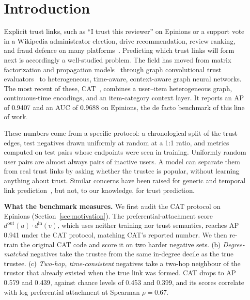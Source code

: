 \documentclass[conference]{IEEEtran}
\begin{document}
\section{Introduction}

Explicit trust links, such as ``I trust this reviewer'' on Epinions or a support vote in a Wikipedia administrator election, drive recommendation, review ranking, and fraud defence on many platforms~\cite{tang2015trust,guha2004propagation}. Predicting which trust links will form next is accordingly a well-studied problem. The field has moved from matrix factorization and propagation models~\cite{yao2013matri,liu2019neuralwalk} through graph convolutional trust evaluators~\cite{lin2020guardian,wang2024trustguard,huo2023trustgnn,jiang2023gatrust} to heterogeneous, time-aware, context-aware graph neural networks. The most recent of these, CAT~\cite{wang2025cat}, combines a user--item heterogeneous graph, continuous-time encodings, and an item-category context layer. It reports an AP of 0.9407 and an AUC of 0.9688 on Epinions, the de facto benchmark of this line of work.

These numbers come from a specific protocol: a chronological split of the trust edges, test negatives drawn uniformly at random at a 1:1 ratio, and metrics computed on test pairs whose endpoints were seen in training. Uniformly random user pairs are almost always pairs of inactive users. A model can separate them from real trust links by asking whether the trustee is popular, without learning anything about trust. Similar concerns have been raised for generic and temporal link prediction~\cite{li2023evaluating,poursafaei2022towards,huang2023tgb}, but not, to our knowledge, for trust prediction.

\textbf{What the benchmark measures.} We first audit the CAT protocol on Epinions (Section~\ref{sec:motivation}). The preferential-attachment score $d^{\text{out}}(u)\cdot d^{\text{in}}(v)$, which uses neither training nor trust semantics, reaches AP 0.941 under the CAT protocol, matching CAT's reported number. We then re-train the original CAT code and score it on two harder negative sets. (b) \emph{Degree-matched} negatives take the trustee from the same in-degree decile as the true trustee. (c) \emph{Two-hop, time-consistent} negatives take a two-hop neighbour of the trustor that already existed when the true link was formed. CAT drops to AP 0.579 and 0.439, against chance levels of 0.453 and 0.399, and its scores correlate with log preferential attachment at Spearman $\rho=0.67$.
\end{document}
